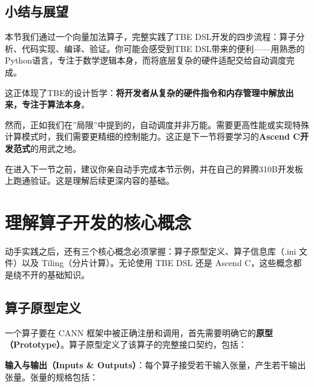 \subsection{小结与展望}\label{src-book-chapter7-h33}

本节我们通过一个向量加法算子，完整实践了TBE
DSL开发的四步流程：算子分析、代码实现、编译、验证。你可能会感受到TBE
DSL带来的便利------用熟悉的Python语言，专注于数学逻辑本身，而将底层复杂的硬件适配交给自动调度完成。

这正体现了TBE的设计哲学：\textbf{将开发者从复杂的硬件指令和内存管理中解放出来，专注于算法本身}。

然而，正如我们在''局限''中提到的，自动调度并非万能。需要更高性能或实现特殊计算模式时，我们需要更精细的控制能力。这正是下一节将要学习的\textbf{Ascend
C开发范式}的用武之地。

在进入下一节之前，建议你亲自动手完成本节示例，并在自己的昇腾310B开发板上跑通验证。这是理解后续更深内容的基础。

\section{理解算子开发的核心概念}\label{src-book-chapter7-h34}

动手实践之后，还有三个核心概念必须掌握：算子原型定义、算子信息库（.ini
文件）以及 Tiling（分片计算）。无论使用 TBE DSL 还是 Ascend
C，这些概念都是绕不开的基础知识。

\subsection{算子原型定义}\label{src-book-chapter7-h35}

一个算子要在 CANN
框架中被正确注册和调用，首先需要明确它的\textbf{原型（Prototype）}。算子原型定义了该算子的完整接口契约，包括：

\textbf{输入与输出（Inputs \&
Outputs）}：每个算子接受若干输入张量，产生若干输出张量。张量的规格包括：

